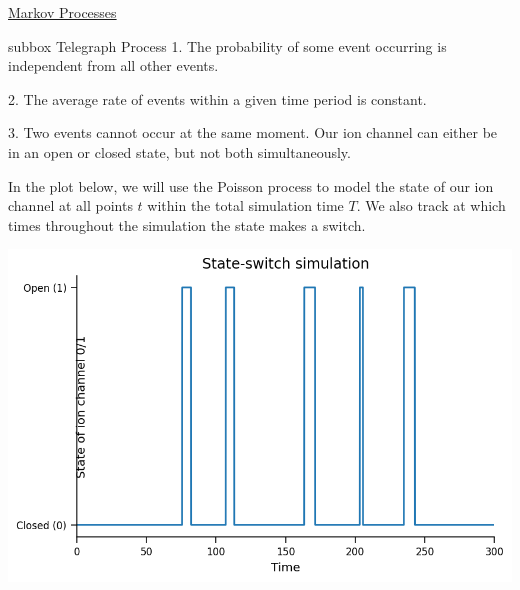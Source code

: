 \begin{textbox}{\href{https://colab.research.google.com/github/NeuromatchAcademy/course-content/blob/master/tutorials/W2D2_LinearSystems/student/W2D2_Tutorial2.ipynb}{Markov Processes }   }
\begin{subbox}{subbox}{ Telegraph Process}
1. The probability of some event occurring is independent from all other events.

2. The average rate of events within a given time period is constant.

3. Two events cannot occur at the same moment. Our ion channel can either be in an open or closed state, but not both simultaneously. 

In the plot below, we will use the Poisson process to model the state of our ion channel at all points $t$ within the total simulation time $T$. We also track at which times throughout the simulation the state makes a switch. 

\centering
\includegraphics[scale=0.25]{Figures/LS/MC_Figure1.png}

\end{subbox}
\end{textbox}
